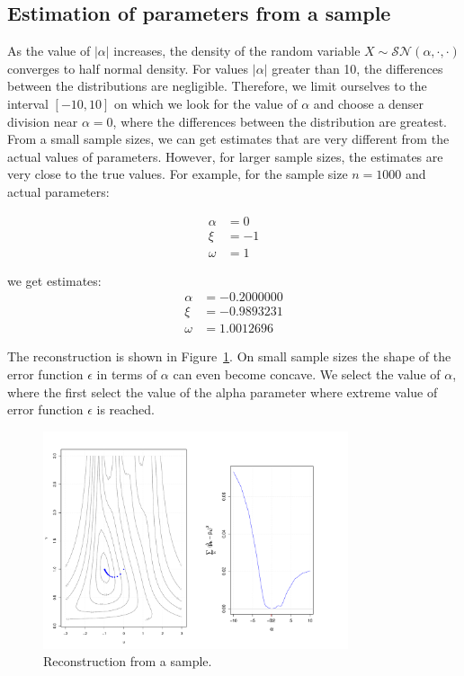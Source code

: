 \documentclass[10pt]{article}
\begin{document}
\subsection{Estimation of parameters from a sample}
As the value of $|\alpha|$ increases, the density of the random variable $X \sim \mathcal{SN}(\alpha, \cdot, \cdot)$ converges to half normal density. For values $|\alpha|$ greater than 10, the differences between the distributions are negligible. Therefore, we limit ourselves to the interval $[-10, 10]$ on which we look for the value of $\alpha$ and choose a denser division near $\alpha = 0$, where the differences between the distribution are greatest. From a small sample sizes, we can get estimates that are very different from the actual values of parameters. However, for larger sample sizes, the estimates are very close to the true values. For example, for the sample size $n=1000$ and actual parameters:

\begin{align*}
\alpha &= 0 \\
\xi &= -1 \\
\omega &= 1
\end{align*}

we get estimates:
\begin{align*}
\alpha &= -0.2000000 \\
\xi &= -0.9893231 \\
\omega &=  1.0012696
\end{align*}

The reconstruction is shown in Figure~\ref{fig: reconstruction_on_sample}. 
On small sample sizes the shape of the error function $\epsilon$ in terms of $\alpha$ can even become concave. We select the value of $\alpha$, where the first select the value of the alpha parameter where extreme value of error function $\epsilon$ is reached.

\begin{figure}
\centering
\includegraphics[width=0.8\textwidth]{alpha_0_trace_close_is_good_enough.pdf}
\caption{ Reconstruction from a sample.}
\label{fig: reconstruction_on_sample}
\end{figure}
\end{document}
